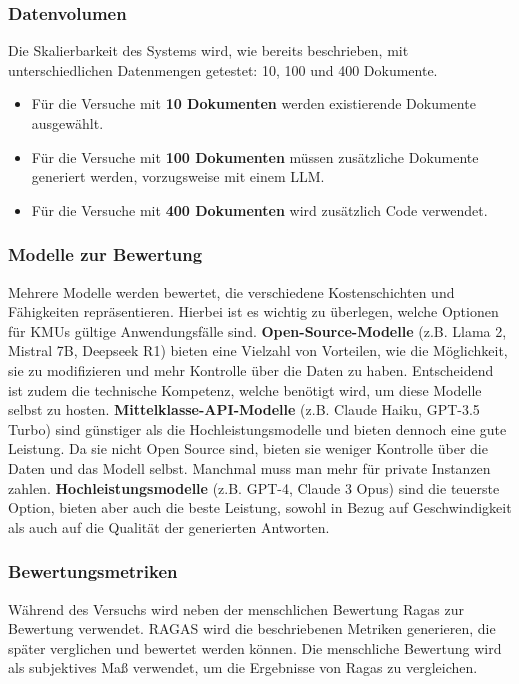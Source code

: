 \subsubsection{Datenvolumen}
Die Skalierbarkeit des Systems wird, wie bereits beschrieben, mit unterschiedlichen Datenmengen getestet: 10, 100 und 400 Dokumente.
\begin{itemize}
    \item Für die Versuche mit \textbf{10 Dokumenten} werden existierende Dokumente ausgewählt.
    \item Für die Versuche mit \textbf{100 Dokumenten} müssen zusätzliche Dokumente generiert werden, vorzugsweise mit einem LLM.
    \item Für die Versuche mit \textbf{400 Dokumenten} wird zusätzlich Code verwendet.
\end{itemize}

\subsubsection{Modelle zur Bewertung}
Mehrere Modelle werden bewertet, die verschiedene Kostenschichten und Fähigkeiten repräsentieren. Hierbei ist es wichtig zu überlegen, welche Optionen für KMUs gültige Anwendungsfälle sind.
\textbf{Open-Source-Modelle} (z.B. Llama 2, Mistral 7B, Deepseek R1) bieten eine Vielzahl von Vorteilen, wie die Möglichkeit, sie zu modifizieren und mehr Kontrolle über die Daten zu haben. Entscheidend ist zudem die technische Kompetenz, welche benötigt wird, um diese Modelle selbst zu hosten.
\textbf{Mittelklasse-API-Modelle} (z.B. Claude Haiku, GPT-3.5 Turbo) sind günstiger als die Hochleistungsmodelle und bieten dennoch eine gute Leistung. Da sie nicht Open Source sind, bieten sie weniger Kontrolle über die Daten und das Modell selbst. Manchmal muss man mehr für private Instanzen zahlen.
\textbf{Hochleistungsmodelle} (z.B. GPT-4, Claude 3 Opus) sind die teuerste Option, bieten aber auch die beste Leistung, sowohl in Bezug auf Geschwindigkeit als auch auf die Qualität der generierten Antworten.

\subsubsection{Bewertungsmetriken}
Während des Versuchs wird neben der menschlichen Bewertung Ragas zur Bewertung verwendet.
RAGAS wird die beschriebenen Metriken generieren, die später verglichen und bewertet werden können.
Die menschliche Bewertung wird als subjektives Maß verwendet, um die Ergebnisse von Ragas zu vergleichen.

